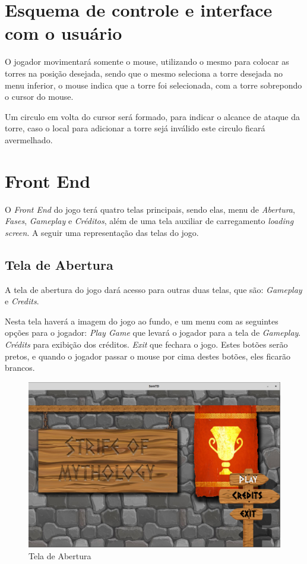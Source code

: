 \documentclass[11pt]{article} %
\begin{document}
\section{Esquema de controle e interface com o usuário}

O jogador movimentará somente o mouse, utilizando o mesmo para colocar as torres na posição desejada, sendo que o mesmo seleciona a torre desejada no menu inferior, o mouse indica que a torre foi selecionada, com a torre sobrepondo o cursor do mouse.

Um circulo em volta do cursor será formado, para indicar o alcance de ataque da torre, caso o local para adicionar a torre sejá inválido este circulo ficará avermelhado.  

\newpage

\section{Front End}

O \textit{Front End} do jogo terá  quatro telas principais, sendo elas, menu de \textit{Abertura}, \textit{Fases}, \textit{Gameplay} e \textit{Créditos}, além de uma tela auxiliar de carregamento \textit{loading screen}. A seguir uma representação das telas do jogo.

\subsection{Tela de Abertura}
A tela de abertura do jogo dará acesso para outras duas telas, que são: \textit{Gameplay} e \textit{Credits}.

Nesta tela haverá a imagem do jogo ao fundo, e um menu com as seguintes opções para o jogador: 
\textit{Play Game} que levará o jogador para a tela de \textit{Gameplay}.
\textit{Crédits} para exibição dos créditos.
\textit{Exit} que fechara o jogo.
Estes botões serão pretos, e quando o jogador passar o mouse por cima destes botões, eles ficarão brancos.\\

\begin{figure}[!htp]
\centering
\includegraphics[scale=0.4]{res/menu_display.png}
\caption{Tela de Abertura}
\label{Abertura}
\end{figure}
\end{document}
